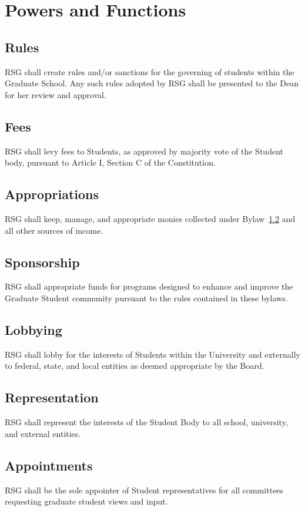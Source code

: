 \chapter{Powers and Functions}
\section{Rules} RSG shall create rules and/or sanctions for the governing of students within the Graduate School. Any such rules adopted by RSG shall be presented to the Dean for her review and approval.

\section{Fees}\label{sec:fees} RSG shall levy fees to Students, as approved by majority vote of the 
Student body, pursuant to Article I, Section C of the Constitution. 

\section{Appropriations} RSG shall keep, manage, and appropriate monies collected under Bylaw~\ref{sec:fees} and all other sources of income.

\section{Sponsorship} RSG shall appropriate funds for programs designed to enhance and improve the Graduate Student 
community pursuant to the rules contained in these bylaws. 

\section{Lobbying} RSG shall lobby for the interests of Students within the University and externally to federal, state, and local entities as deemed appropriate by the 
Board. 

\section{Representation} RSG shall represent the interests of the Student Body to all 
school, university, and external entities. 

\section{Appointments} RSG shall be the sole appointer of Student representatives for all committees requesting graduate student views and input. 


